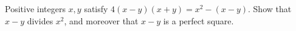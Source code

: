 Positive integers $x,y$ satisfy $4(x-y)(x+y)=x^2-(x-y)$. Show that $x-y$ divides $x^2$, and moreover that $x-y$ is a perfect square.
